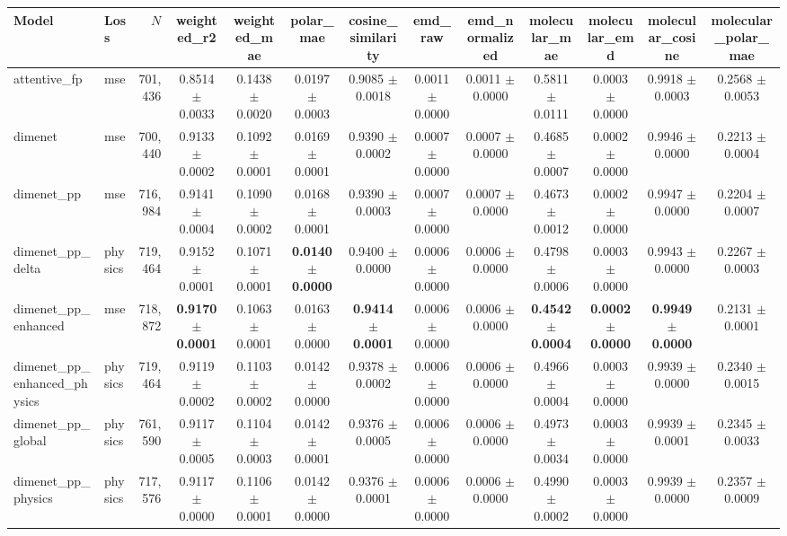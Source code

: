 \begin{tabular}{llrcccccccccc}
\toprule
Model & Loss & $N$ & weighted\_r2 & weighted\_mae & polar\_mae & cosine\_similarity & emd\_raw & emd\_normalized & molecular\_mae & molecular\_emd & molecular\_cosine & molecular\_polar\_mae \\
\midrule
attentive\_fp & mse & 701,436 & 0.8514 $\pm$ 0.0033 & 0.1438 $\pm$ 0.0020 & 0.0197 $\pm$ 0.0003 & 0.9085 $\pm$ 0.0018 & 0.0011 $\pm$ 0.0000 & 0.0011 $\pm$ 0.0000 & 0.5811 $\pm$ 0.0111 & 0.0003 $\pm$ 0.0000 & 0.9918 $\pm$ 0.0003 & 0.2568 $\pm$ 0.0053 \\
dimenet & mse & 700,440 & 0.9133 $\pm$ 0.0002 & 0.1092 $\pm$ 0.0001 & 0.0169 $\pm$ 0.0001 & 0.9390 $\pm$ 0.0002 & 0.0007 $\pm$ 0.0000 & 0.0007 $\pm$ 0.0000 & 0.4685 $\pm$ 0.0007 & 0.0002 $\pm$ 0.0000 & 0.9946 $\pm$ 0.0000 & 0.2213 $\pm$ 0.0004 \\
dimenet\_pp & mse & 716,984 & 0.9141 $\pm$ 0.0004 & 0.1090 $\pm$ 0.0002 & 0.0168 $\pm$ 0.0001 & 0.9390 $\pm$ 0.0003 & 0.0007 $\pm$ 0.0000 & 0.0007 $\pm$ 0.0000 & 0.4673 $\pm$ 0.0012 & 0.0002 $\pm$ 0.0000 & 0.9947 $\pm$ 0.0000 & 0.2204 $\pm$ 0.0007 \\
dimenet\_pp\_delta & physics & 719,464 & 0.9152 $\pm$ 0.0001 & 0.1071 $\pm$ 0.0001 & \textbf{0.0140 $\pm$ 0.0000} & 0.9400 $\pm$ 0.0000 & 0.0006 $\pm$ 0.0000 & 0.0006 $\pm$ 0.0000 & 0.4798 $\pm$ 0.0006 & 0.0003 $\pm$ 0.0000 & 0.9943 $\pm$ 0.0000 & 0.2267 $\pm$ 0.0003 \\
dimenet\_pp\_enhanced & mse & 718,872 & \textbf{0.9170 $\pm$ 0.0001} & 0.1063 $\pm$ 0.0001 & 0.0163 $\pm$ 0.0000 & \textbf{0.9414 $\pm$ 0.0001} & 0.0006 $\pm$ 0.0000 & 0.0006 $\pm$ 0.0000 & \textbf{0.4542 $\pm$ 0.0004} & \textbf{0.0002 $\pm$ 0.0000} & \textbf{0.9949 $\pm$ 0.0000} & 0.2131 $\pm$ 0.0001 \\
dimenet\_pp\_enhanced\_physics & physics & 719,464 & 0.9119 $\pm$ 0.0002 & 0.1103 $\pm$ 0.0002 & 0.0142 $\pm$ 0.0000 & 0.9378 $\pm$ 0.0002 & 0.0006 $\pm$ 0.0000 & 0.0006 $\pm$ 0.0000 & 0.4966 $\pm$ 0.0004 & 0.0003 $\pm$ 0.0000 & 0.9939 $\pm$ 0.0000 & 0.2340 $\pm$ 0.0015 \\
dimenet\_pp\_global & physics & 761,590 & 0.9117 $\pm$ 0.0005 & 0.1104 $\pm$ 0.0003 & 0.0142 $\pm$ 0.0001 & 0.9376 $\pm$ 0.0005 & 0.0006 $\pm$ 0.0000 & 0.0006 $\pm$ 0.0000 & 0.4973 $\pm$ 0.0034 & 0.0003 $\pm$ 0.0000 & 0.9939 $\pm$ 0.0001 & 0.2345 $\pm$ 0.0033 \\
dimenet\_pp\_physics & physics & 717,576 & 0.9117 $\pm$ 0.0000 & 0.1106 $\pm$ 0.0001 & 0.0142 $\pm$ 0.0000 & 0.9376 $\pm$ 0.0001 & 0.0006 $\pm$ 0.0000 & 0.0006 $\pm$ 0.0000 & 0.4990 $\pm$ 0.0002 & 0.0003 $\pm$ 0.0000 & 0.9939 $\pm$ 0.0000 & 0.2357 $\pm$ 0.0009 \\

\end{tabular}
